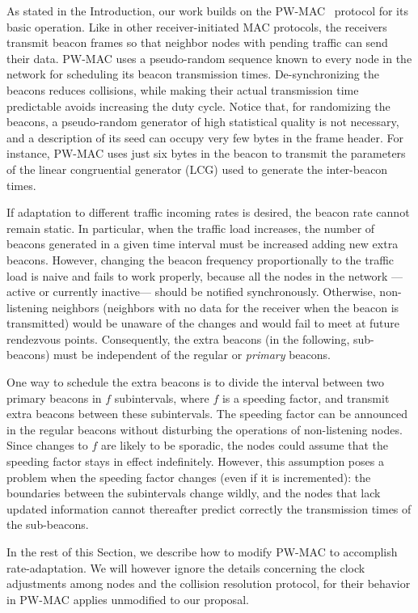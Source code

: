 \documentclass[journal,english,twocolumn,10pt,letterpaper]{IEEEtran}
\begin{document}
As stated in the Introduction, our work builds on the
PW-MAC~\cite{tang11:_pw_macy} protocol for its basic operation. Like in other
receiver-initiated MAC protocols, the receivers transmit beacon frames so that
neighbor nodes with pending traffic can send their data. PW-MAC uses a
pseudo-random sequence known to every node in the network for scheduling its
beacon transmission times. De-synchronizing the beacons reduces collisions,
while making their actual transmission time predictable avoids increasing the
duty cycle. Notice that, for randomizing the beacons, a pseudo-random
generator of high statistical quality is not necessary, and a description of
its seed can occupy very few bytes in the frame header. For instance, PW-MAC
uses just six bytes in the beacon to transmit the parameters of the linear
congruential generator (LCG) used to generate the inter-beacon times.

If adaptation to different traffic incoming rates is desired, the beacon rate
cannot remain static. In particular, when the traffic load increases, the
number of beacons generated in a given time interval must be increased adding
new extra beacons. However, changing the beacon frequency proportionally to
the traffic load is naive and fails to work properly, because all the nodes in
the network ---active or currently inactive--- should be notified
synchronously. Otherwise, non-listening neighbors (neighbors with no data for
the receiver when the beacon is transmitted) would be unaware of the changes
and would fail to meet at future rendezvous points. Consequently, the extra
beacons (in the following, sub-beacons) must be independent of the regular or
\emph{primary} beacons.

One way to schedule the extra beacons is to divide the interval between two
primary beacons in $f$ subintervals, where $f$ is a speeding factor, and
transmit extra beacons between these subintervals. The speeding factor can be
announced in the regular beacons without disturbing the operations of
non-listening nodes. Since changes to $f$ are likely to be sporadic, the nodes
could assume that the speeding factor stays in effect indefinitely. However,
this assumption poses a problem when the speeding factor changes (even if it
is incremented): the boundaries between the subintervals change wildly, and
the nodes that lack updated information cannot thereafter predict correctly
the transmission times of the sub-beacons.

In the rest of this Section, we describe how to modify PW-MAC to accomplish
rate-adaptation. We will however ignore the details concerning the clock
adjustments among nodes and the collision resolution protocol, for their
behavior in PW-MAC applies unmodified to our proposal.
\end{document}
